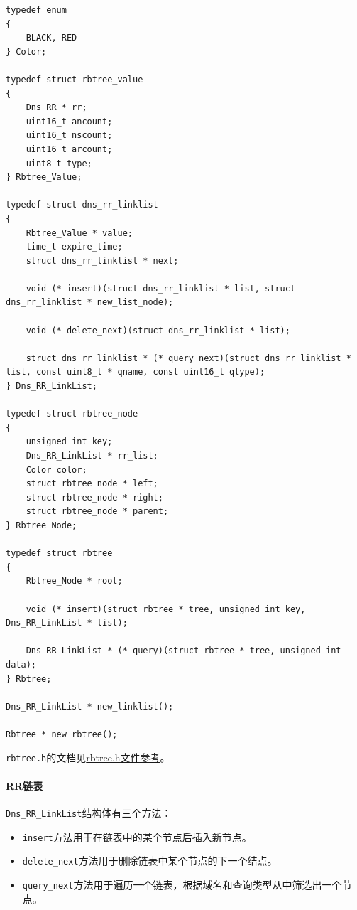 \documentclass[lang=cn,11pt,a4paper,cite=authornum]{paper}
\begin{document}
\begin{code}
\begin{verbatim}
typedef enum
{
    BLACK, RED
} Color;
 
typedef struct rbtree_value
{
    Dns_RR * rr; 
    uint16_t ancount; 
    uint16_t nscount; 
    uint16_t arcount; 
    uint8_t type; 
} Rbtree_Value;
 
typedef struct dns_rr_linklist
{
    Rbtree_Value * value; 
    time_t expire_time; 
    struct dns_rr_linklist * next; 
    
    void (* insert)(struct dns_rr_linklist * list, struct dns_rr_linklist * new_list_node);
    
    void (* delete_next)(struct dns_rr_linklist * list);
    
    struct dns_rr_linklist * (* query_next)(struct dns_rr_linklist * list, const uint8_t * qname, const uint16_t qtype);
} Dns_RR_LinkList;
 
typedef struct rbtree_node
{
    unsigned int key; 
    Dns_RR_LinkList * rr_list; 
    Color color; 
    struct rbtree_node * left; 
    struct rbtree_node * right; 
    struct rbtree_node * parent; 
} Rbtree_Node;
 
typedef struct rbtree
{
    Rbtree_Node * root; 
    
    void (* insert)(struct rbtree * tree, unsigned int key, Dns_RR_LinkList * list);
    
    Dns_RR_LinkList * (* query)(struct rbtree * tree, unsigned int data);
} Rbtree;
 
Dns_RR_LinkList * new_linklist();
 
Rbtree * new_rbtree();
\end{verbatim}
\end{code}

\texttt{rbtree.h}的文档见\href{run:./APIdoc/rbtree_8h.html}{rbtree.h文件参考}。

\paragraph{RR链表}

\texttt{Dns_RR_LinkList}结构体有三个方法：

\begin{itemize}
    \item \texttt{insert}方法用于在链表中的某个节点后插入新节点。
    \item \texttt{delete_next}方法用于删除链表中某个节点的下一个结点。
    \item \texttt{query_next}方法用于遍历一个链表，根据域名和查询类型从中筛选出一个节点。
\end{itemize}
\end{document}
